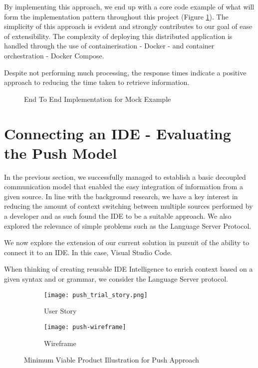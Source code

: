 By implementing this approach, we end up with a core code example of what will form the implementation pattern throughout this project (Figure \ref{fig:e2eMockClass}). The simplicity of this approach is evident and strongly contributes to our goal of ease of extensibility. The complexity of deploying this distributed application is handled through the use of containerisation - Docker - and container orchestration - Docker Compose. 

Despite not performing much processing, the response times indicate a positive approach to reducing the time taken to retrieve information. 



\begin{figure}[h!]
	\centering
	
	\caption{End To End Implementation for Mock Example}
	\label{fig:e2eMockClass}
\end{figure}

\section{Connecting an IDE - Evaluating the Push Model}

In the previous section, we successfully managed to establish a basic decoupled communication model that enabled the easy integration of information from a given source. In line with the background research, we have a key interest in reducing the amount of context switching between multiple sources performed by a developer and as such found the IDE to be a suitable approach. We also explored the relevance of simple problems such as the Language Server Protocol. 

We now explore the extension of our current solution in pursuit of the ability to connect it to an IDE. In this case, Visual Studio Code. 

When thinking of creating reusable IDE Intelligence to enrich context based on a given syntax and or grammar, we consider the Language Server protocol. 

\begin{figure}[h!]
	\centering
	\begin{subfigure}[t]{0.3\textwidth}
		\texttt{[image: push\_trial\_story.png]}
		\caption{User Story}
	\end{subfigure}
	\begin{subfigure}[t]{0.6\textwidth}
		\texttt{[image: push-wireframe]}
		\caption{Wireframe}
	\end{subfigure}
	\label{fig:mvpPush}
	\caption{Minimum Viable Product Illustration for Push Approach}
\end{figure}

